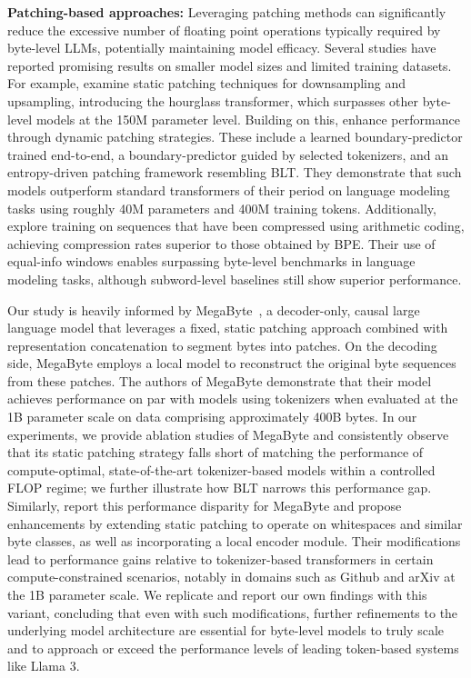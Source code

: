 \textbf{Patching-based approaches:} Leveraging patching methods can significantly reduce the excessive number of floating point operations typically required by byte-level LLMs, potentially maintaining model efficacy. Several studies have reported promising results on smaller model sizes and limited training datasets. For example, \cite{nawrot-etal-2022-hierarchical} examine static patching techniques for downsampling and upsampling, introducing the hourglass transformer, which surpasses other byte-level models at the 150M parameter level. Building on this, \cite{nawrot-etal-2023-efficient} enhance performance through dynamic patching strategies. These include a learned boundary-predictor trained end-to-end, a boundary-predictor guided by selected tokenizers, and an entropy-driven patching framework resembling {\textsc BLT}. They demonstrate that such models outperform standard transformers of their period on language modeling tasks using roughly 40M parameters and 400M training tokens. Additionally, \cite{lester2024training} explore training on sequences that have been compressed using arithmetic coding, achieving compression rates superior to those obtained by BPE. Their use of equal-info windows enables surpassing byte-level benchmarks in language modeling tasks, although subword-level baselines still show superior performance.

Our study is heavily informed by MegaByte~\citep{yu2023megabyte}, a decoder-only, causal large language model that leverages a fixed, static patching approach combined with representation concatenation to segment bytes into patches. On the decoding side, MegaByte employs a local model to reconstruct the original byte sequences from these patches. The authors of MegaByte demonstrate that their model achieves performance on par with models using tokenizers when evaluated at the 1B parameter scale on data comprising approximately 400B bytes. In our experiments, we provide ablation studies of MegaByte and consistently observe that its static patching strategy falls short of matching the performance of compute-optimal, state-of-the-art tokenizer-based models within a controlled FLOP regime; we further illustrate how {\textsc BLT} narrows this performance gap. Similarly, \cite{slagle2024spacebyte} report this performance disparity for MegaByte and propose enhancements by extending static patching to operate on whitespaces and similar byte classes, as well as incorporating a local encoder module. Their modifications lead to performance gains relative to tokenizer-based transformers in certain compute-constrained scenarios, notably in domains such as Github and arXiv at the 1B parameter scale. We replicate and report our own findings with this variant, concluding that even with such modifications, further refinements to the underlying model architecture are essential for byte-level models to truly scale and to approach or exceed the performance levels of leading token-based systems like Llama 3.

